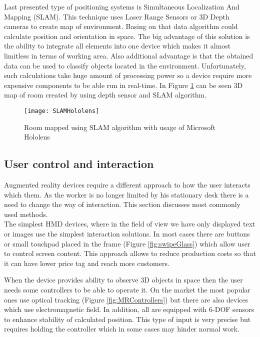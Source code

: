 \documentclass[printmode,en]{mgr}
\begin{document}
Last presented type of positioning systems is Simultaneous Localization And Mapping (SLAM). This technique uses Laser Range Sensors or 3D Depth cameras to create map of environment. Basing on that data algorithm could calculate position and orientation in space. The big advantage of this solution is the ability to integrate all elements into one device which makes it almost limitless in terms of working area. Also additional advantage is that the obtained data can be used to classify objects located in the environment. Unfortunately, such calculations take huge amount of processing power so a device require more expensive components to be able run in real-time. In Figure \ref{fig:SLAMHololens} can be seen 3D map of room created by using depth sensor and SLAM algorithm.

\begin{figure}[!ht]
  \centering
    \texttt{[image: SLAMHololens]}
  \caption{Room mapped using SLAM algorithm with usage of Microsoft Hololens}
  \label{fig:SLAMHololens}
\end{figure}

\subsection{User control and interaction}
Augmented reality devices require a different approach to how the user interacts which them. As the worker is no longer limited by his stationary desk there is a need to change the way of interaction. This section discusses most commonly used methods.\\

The simplest HMD devices, where in the field of view we have only displayed text or images use the simplest interaction solutions. In most cases there are buttons or small touchpad placed in the frame (Figure \ref{fig:swipeGlass}) which allow user to control screen content. This approach allows to reduce production costs so that it can have lower price tag and reach more customers.

When the device provides ability to observe 3D objects in space then the user needs some controllers to be able to operate it. On the market the most popular ones use optical tracking (Figure \ref{fig:MRControllers}) but there are also devices which use electromagnetic field. In addition, all are equipped with 6-DOF sensors to enhance stability of calculated position. This type of input is very precise but requires holding the controller which in some cases may hinder normal work.
\end{document}
